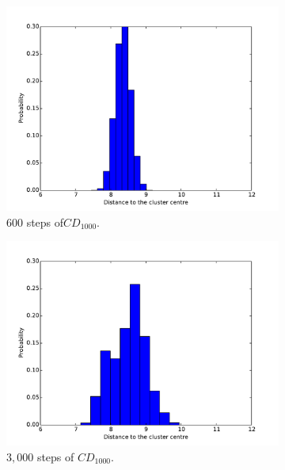 \begin{figure}[hbt]
\begin{subfigure}[t]{0.18\textwidth}
			\includegraphics[width=\textwidth]{pics_sdbn/cdk_100.pdf}
		    \caption{$600$ steps of$CD_{1000}$.}
		\end{subfigure}
		\begin{subfigure}[t]{0.18\textwidth}
			\includegraphics[width=\textwidth]{pics_sdbn/cdk_500.pdf}
		    \caption{$3,000$ steps of $CD_{1000}$.}
		\end{subfigure}
		\begin{subfigure}[t]{0.18\textwidth}

\end{subfigure}
\end{figure}
